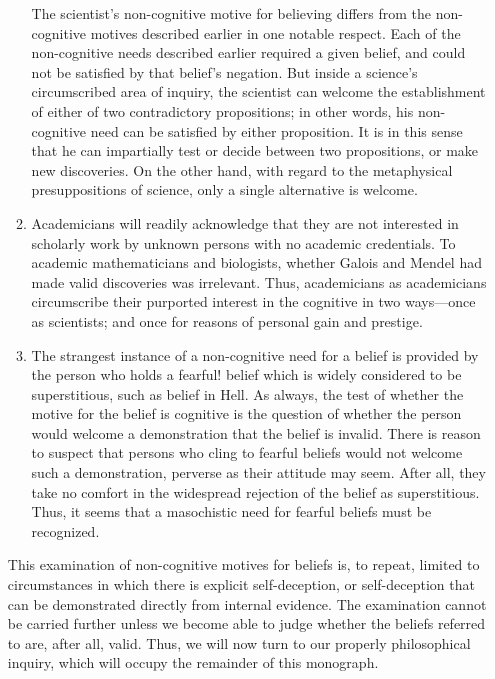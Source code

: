 \documentclass[10pt,twoside]{memoir}
\begin{document}
\begin{enumerate}
\begin{enumerate}
The scientist's non-cognitive motive for believing differs from the 
non-cognitive motives described earlier in one notable respect. Each of the 
non-cognitive needs described earlier required a given belief, and could not 
be satisfied by that belief's negation. But inside a science's circumscribed 
area of inquiry, the scientist can welcome the establishment of either of two 
contradictory propositions; in other words, his non-cognitive need can be 
satisfied by either proposition. It is in this sense that he can impartially test 
or decide between two propositions, or make new discoveries. On the other 
hand, with regard to the metaphysical presuppositions of science, only a 
single alternative is welcome. 

\item Academicians will readily acknowledge that they are not interested 
in scholarly work by unknown persons with no academic credentials. To 
academic mathematicians and biologists, whether Galois and Mendel had 
made valid discoveries was irrelevant. Thus, academicians as academicians 
circumscribe their purported interest in the cognitive in two ways---once as 
scientists; and once for reasons of personal gain and prestige. 

\item The strangest instance of a non-cognitive need for a belief is 
provided by the person who holds a fearful! belief which is widely considered 
to be superstitious, such as belief in Hell. As always, the test of whether the 
motive for the belief is cognitive is the question of whether the person would 
welcome a demonstration that the belief is invalid. There is reason to suspect 
that persons who cling to fearful beliefs would not welcome such a 
demonstration, perverse as their attitude may seem. After all, they take no 
comfort in the widespread rejection of the belief as superstitious. Thus, it 
seems that a masochistic need for fearful beliefs must be recognized. 
\end{enumerate}

This examination of non-cognitive motives for beliefs is, to repeat, 
limited to circumstances in which there is explicit self-deception, or 
self-deception that can be demonstrated directly from internal evidence. The 
examination cannot be carried further unless we become able to judge 
whether the beliefs referred to are, after all, valid. Thus, we will now turn to 
our properly philosophical inquiry, which will occupy the remainder of this 
monograph. 



\end{enumerate}
\end{document}
